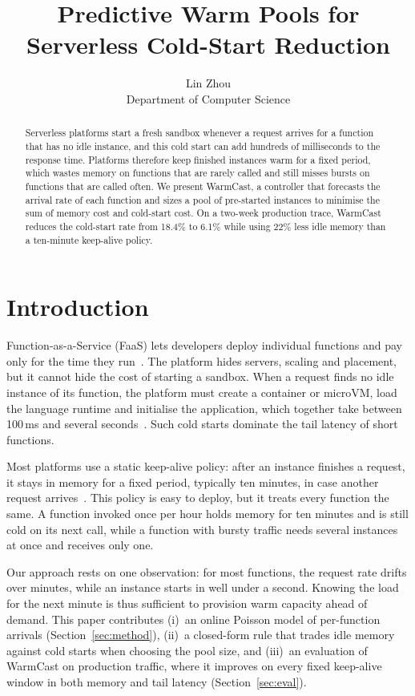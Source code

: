 \documentclass[10pt]{article}
\title{Predictive Warm Pools for Serverless Cold-Start Reduction}
\author{Lin Zhou\\Department of Computer Science}
\date{}
\begin{document}
\maketitle

\begin{abstract}
Serverless platforms start a fresh sandbox whenever a request arrives for a
function that has no idle instance, and this cold start can add hundreds of
milliseconds to the response time. Platforms therefore keep finished instances
warm for a fixed period, which wastes memory on functions that are rarely
called and still misses bursts on functions that are called often. We present
WarmCast, a controller that forecasts the arrival rate of each function and
sizes a pool of pre-started instances to minimise the sum of memory cost and
cold-start cost. On a two-week production trace, WarmCast reduces the
cold-start rate from 18.4\% to 6.1\% while using 22\% less idle memory than a
ten-minute keep-alive policy.
\end{abstract}

\section{Introduction}
\label{sec:intro}

Function-as-a-Service (FaaS) lets developers deploy individual functions and
pay only for the time they run~\cite{jonas2019cloud}. The platform hides
servers, scaling and placement, but it cannot hide the cost of starting a
sandbox. When a request finds no idle instance of its function, the platform
must create a container or microVM, load the language runtime and initialise
the application, which together take between 100\,ms and several
seconds~\cite{wang2018peeking,oakes2018sock}. Such cold starts dominate the
tail latency of short functions.

Most platforms use a static keep-alive policy: after an instance finishes a
request, it stays in memory for a fixed period, typically ten minutes, in case
another request arrives~\cite{shahrad2020serverless}. This policy is easy to
deploy, but it treats every function the same. A function invoked once per
hour holds memory for ten minutes and is still cold on its next call, while a
function with bursty traffic needs several instances at once and receives
only one.

Our approach rests on one observation: for most functions, the request rate
drifts over minutes, while an instance starts in well under a second. Knowing
the load for the next minute is thus sufficient to provision warm capacity
ahead of demand. This paper contributes (i)~an online Poisson model of
per-function arrivals (Section~\ref{sec:method}), (ii)~a closed-form rule
that trades idle memory against cold starts when choosing the pool size, and
(iii)~an evaluation of WarmCast on production traffic, where it improves on
every fixed keep-alive window in both memory and tail latency
(Section~\ref{sec:eval}).
\end{document}
